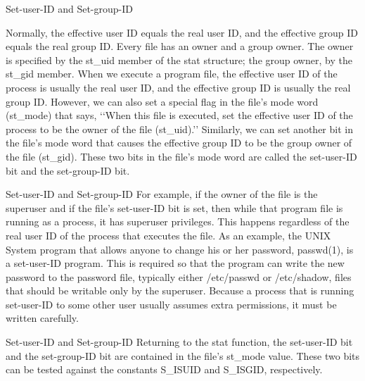 \documentclass{beamer}
\begin{document}
 \begin{frame}[t]{Set-user-ID and Set-group-ID}
 
 Normally, the effective user ID equals the real user ID, and the effective group ID equals
 the real group ID.
 Every file has an owner and a group owner. The owner is specified by the st\_uid
 member of the stat structure; the group owner, by the st\_gid member.
 When we execute a program file, the effective user ID of the process is usually the
 real user ID, and the effective group ID is usually the real group ID. However, we can
 also set a special flag in the file’s mode word (st\_mode) that says, ‘‘When this file is
 executed, set the effective user ID of the process to be the owner of the file (st\_uid).’’
 Similarly, we can set another bit in the file’s mode word that causes the effective group
 ID to be the group owner of the file (st\_gid). These two bits in the file’s mode word
 are called the set-user-ID bit and the set-group-ID bit.
 
 
 
 
 
 
\end{frame}
\begin{frame}[t]{Set-user-ID and Set-group-ID}
For example, if the owner of the file is the superuser and if the file’s set-user-ID bit
is set, then while that program file is running as a process, it has superuser privileges.
This happens regardless of the real user ID of the process that executes the file. As an
example, the UNIX System program that allows anyone to change his or her password,
passwd(1), is a set-user-ID program. This is required so that the program can write the
new password to the password file, typically either /etc/passwd or /etc/shadow,
files that should be writable only by the superuser. Because a process that is running
set-user-ID to some other user usually assumes extra permissions, it must be written
carefully.




\end{frame}
\begin{frame}[t]{Set-user-ID and Set-group-ID}
Returning to the stat function, the set-user-ID bit and the set-group-ID bit are
contained in the file’s st\_mode value. These two bits can be tested against the
constants S\_ISUID and S\_ISGID, respectively.
\end{frame}
\end{document}
